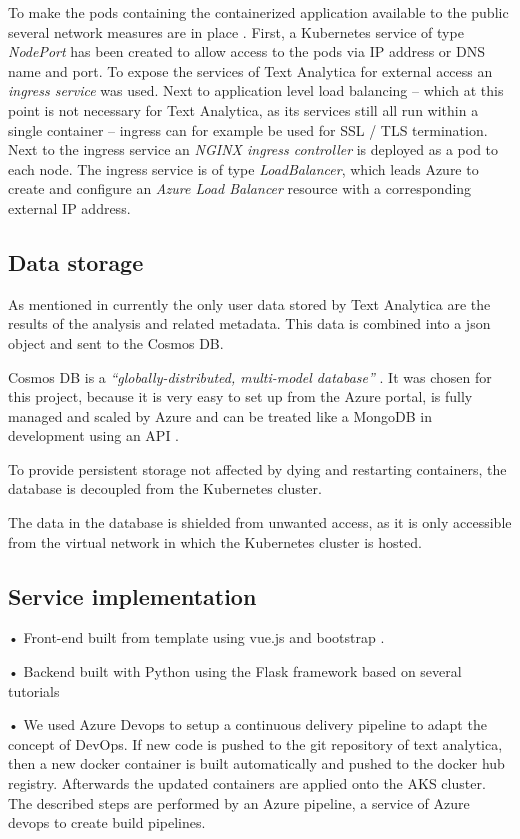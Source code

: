 \documentclass[conference]{IEEEtran}
\begin{document}
To make the pods containing the containerized application available to the public several network measures are in place \cite{AKSNetworks} \cite{AzureExposeKubernetesCluster}. First, a Kubernetes service of type \textit{NodePort} has been created to allow access to the pods via IP address or DNS name and port. To expose the services of Text Analytica for external access an \textit{ingress service} was used. Next to application level load balancing – which at this point is not necessary for Text Analytica, as its services still all run within a single container – ingress can for example be used for SSL / TLS termination. Next to the ingress service an \textit{NGINX ingress controller} is deployed as a pod to each node. The ingress service is of type \textit{LoadBalancer}, which leads Azure to create and configure an \textit{Azure Load Balancer} resource with a corresponding external IP address.

\subsection{Data storage}
As mentioned in  currently the only user data stored by Text Analytica are the results of the analysis and related metadata. This data is combined into a json object and sent to the Cosmos DB.

Cosmos DB is a \textit{“globally-distributed, multi-model database”} \cite{CosmosDB}. It was chosen for this project, because it is very easy to set up from the Azure portal, is fully managed and scaled by Azure and can be treated like a MongoDB in development using an API \cite{CosmosMongoDB}.

To provide persistent storage not affected by dying and restarting containers, the database is decoupled from the Kubernetes cluster.

The data in the database is shielded from unwanted access, as it is only accessible from the virtual network in which the Kubernetes cluster is hosted.

\subsection{Service implementation}
•	Front-end built from template using vue.js and bootstrap \cite{Bootstrap}.

•	Backend built with Python using the Flask framework based on several tutorials

•	We used Azure Devops to setup a continuous delivery pipeline to adapt the concept of DevOps. If new code is pushed to the git repository of text analytica, then a new docker container is built automatically and pushed to the docker hub registry. Afterwards the updated containers are applied onto the AKS cluster. The described steps are performed by an Azure pipeline, a service of Azure devops to create build pipelines.
\end{document}
